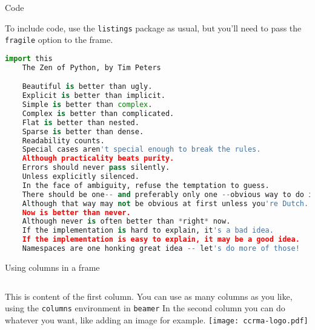 \documentclass{beamer}
\begin{document}
\begin{frame}[fragile]{Code}

    To include code, use the \texttt{listings} package as usual, but you'll need
    to pass the \texttt{fragile} option to the frame.


    \begin{lstlisting}[language=Python, keywordstyle=\color{orange}]
    import this
    The Zen of Python, by Tim Peters

    Beautiful is better than ugly.
    Explicit is better than implicit.
    Simple is better than complex.
    Complex is better than complicated.
    Flat is better than nested.
    Sparse is better than dense.
    Readability counts.
    Special cases aren't special enough to break the rules.
    Although practicality beats purity.
    Errors should never pass silently.
    Unless explicitly silenced.
    In the face of ambiguity, refuse the temptation to guess.
    There should be one-- and preferably only one --obvious way to do it.
    Although that way may not be obvious at first unless you're Dutch.
    Now is better than never.
    Although never is often better than *right* now.
    If the implementation is hard to explain, it's a bad idea.
    If the implementation is easy to explain, it may be a good idea.
    Namespaces are one honking great idea -- let's do more of those!
    \end{lstlisting}


\end{frame}


\begin{frame}{Using columns in a frame}
    \begin{columns}[t]
            This is content of the first column. You can use as many columns as you like, using the \texttt{columns} environment in \texttt{beamer}
            In the second column you can do whatever you want, like adding an image for example.
            \texttt{[image: ccrma-logo.pdf]}
    \end{columns}
\end{frame}
\end{document}
